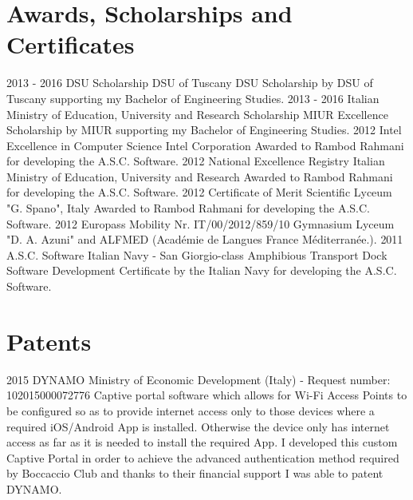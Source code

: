 \documentclass[]{friggeri-cv} %
\begin{document}
\section{Awards, Scholarships and Certificates}
\vspace{-3mm}
\begin{entrylist}
\entry
{2013 - 2016}
{DSU Scholarship}
{DSU of Tuscany}
{DSU Scholarship by DSU of Tuscany supporting my Bachelor of Engineering Studies.}
\entry
{2013 - 2016}
{Italian Ministry of Education, University and Research Scholarship}
{MIUR}
{Excellence Scholarship by MIUR supporting my Bachelor of Engineering Studies.}
\entry
{2012}
{Intel Excellence in Computer Science}
{Intel Corporation}
{Awarded to Rambod Rahmani for developing the A.S.C. Software.}
\entry
{2012}
{National Excellence Registry}
{Italian Ministry of Education, University and Research}
{Awarded to Rambod Rahmani for developing the A.S.C. Software.}
\entry
{2012}
{Certificate of Merit}
{Scientific Lyceum "G. Spano", Italy}
{Awarded to Rambod Rahmani for developing the A.S.C. Software.}
\entry
{2012}
{Europass Mobility Nr. IT/00/2012/859/10}
{}
{Gymnasium Lyceum "D. A. Azuni" and ALFMED (Acad\'emie de Langues France M\'editerran\'ee.).}
\entry
{2011}
{A.S.C. Software}
{Italian Navy - San Giorgio-class Amphibious Transport Dock}
{Software Development Certificate by the Italian Navy for developing the A.S.C. Software.}
\end{entrylist}


\section{Patents}
\vspace{-3mm}
\begin{entrylist}
\entry
{2015}
{DYNAMO}
{Ministry of Economic Development (Italy) - Request number: 102015000072776}
{Captive portal software which allows for Wi-Fi Access Points to be configured so as to provide internet access only to those devices where a required iOS/Android App is installed. Otherwise the device only has internet access as far as it is needed to install the required App. I developed this custom Captive Portal in order to achieve the advanced authentication method required by Boccaccio Club and thanks to their financial support I was able to patent DYNAMO.}
\end{entrylist}
\end{document}
